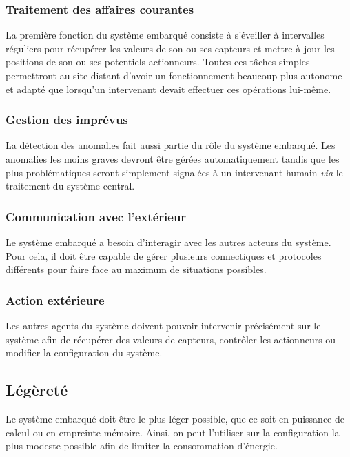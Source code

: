 \documentclass[a4paper, 11pt, final]{article}
\begin{document}
\subsubsection{Traitement des affaires courantes}
La première fonction du système embarqué consiste à s'éveiller à intervalles réguliers pour récupérer les valeurs de son ou ses capteurs et mettre à jour les positions de son ou ses potentiels actionneurs. Toutes ces tâches simples permettront au site distant d'avoir un fonctionnement beaucoup plus autonome et adapté que lorsqu'un intervenant devait effectuer ces opérations lui-même.
	
	
	
\subsubsection{Gestion des imprévus}

La détection des anomalies fait aussi partie du rôle du système embarqué. Les anomalies les moins graves devront être gérées automatiquement tandis que les plus problématiques seront simplement signalées à un intervenant humain \textit{via} le traitement du système central.

\subsubsection{Communication avec l'extérieur}

Le système embarqué a besoin d'interagir avec les autres acteurs du système. Pour cela, il doit être capable de gérer plusieurs connectiques et protocoles différents pour faire face au maximum de situations possibles.

\subsubsection{Action extérieure}

Les autres agents du système doivent pouvoir intervenir précisément sur le système afin de récupérer des valeurs de capteurs, contrôler les actionneurs ou modifier la configuration du système.

\subsection{Légèreté}

Le système embarqué doit être le plus léger possible, que ce soit en puissance de calcul ou en empreinte mémoire. Ainsi, on peut l'utiliser sur la configuration la plus modeste possible afin de limiter la consommation d'énergie.
\end{document}
